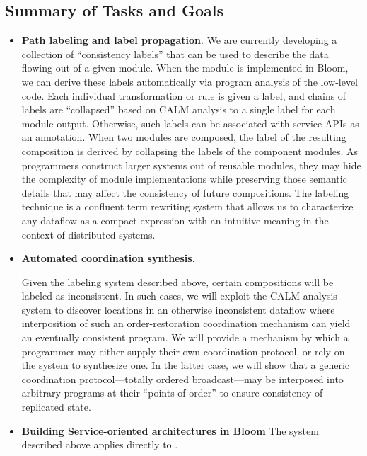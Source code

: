 \subsection{Summary of Tasks and Goals}



\begin{itemize}
\item \textbf{Path labeling and label propagation}.
We are currently developing a collection of ``consistency labels'' that 
can be used to describe the data flowing out of a given module.  When the module
is implemented in Bloom, we can derive these labels automatically via program
analysis of the low-level code.  Each individual transformation or rule is 
given a label, and chains of labels are ``collapsed'' based on CALM analysis to 
a single label for each module output.  
Otherwise, such labels can be associated with service APIs as an annotation.  
When two modules are composed, the label of the resulting composition is derived
by collapsing the labels of the component modules.
As programmers construct larger systems out of reusable modules, they may 
hide the complexity of module implementations while preserving those semantic 
details that may affect the consistency of future compositions. The 
labeling technique is a confluent term rewriting system that allows us to 
characterize any dataflow as a compact expression with an intuitive 
meaning in the context of distributed systems.

\item \textbf{Automated coordination synthesis}.

Given the labeling system described above, certain compositions will be 
labeled as inconsistent.  In such cases, we will exploit the CALM
analysis system to discover locations in an otherwise 
inconsistent dataflow where interposition of such an order-restoration 
coordination mechanism can yield an eventually consistent program.
We will provide a mechanism by which a programmer may either supply 
their own coordination protocol, or rely on the system to synthesize one. 
In the latter case, we will show that a generic coordination 
protocol---totally ordered broadcast---may be interposed into arbitrary 
programs at their ``points of order''
to ensure consistency of replicated state.

\item \textbf{Building Service-oriented architectures in Bloom}
The system described above applies directly to .
\end{itemize}


